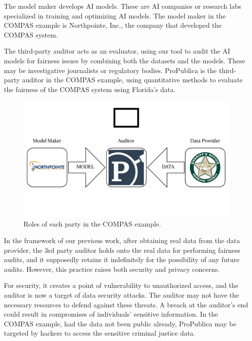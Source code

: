 \documentclass[manuscript,screen,review,anonymous]{acmart}
\begin{document}
The model maker develops AI models. These are AI companies or research labs specialized in training and optimizing AI models. The model maker in the COMPAS example is Northpointe, Inc., the company that developed the COMPAS system.

The third-party auditor acts as an evaluator, using our tool to audit the AI models for fairness issues by combining both the datasets and the models. These may be investigative journalists or regulatory bodies. ProPublica is the third-party auditor in the COMPAS example, using quantitative methods to evaluate the fairness of the COMPAS system using Florida's data.

\begin{figure}[h]
  \centering
  \includegraphics[width=\linewidth]{compas}
  \caption{Roles of each party in the COMPAS example.}
  \label{fig:compas}
\end{figure}

In the framework of our previous work\cite{yuan2024ensuring}, after obtaining real data from the data provider, the 3rd party auditor holds onto the real data for performing fairness audits, and it supposedly retains it indefinitely for the possibility of any future audits. However, this practice raises both security and privacy concerns.

For security, it creates a point of vulnerability to unauthorized access, and the auditor is now a target of data security attacks. The auditor may not have the necessary resources to defend against these threats. A breach at the auditor's end could result in compromises of individuals' sensitive information. In the COMPAS example, had the data not been public already, ProPublica may be targeted by hackers to access the sensitive criminal justice data.
\end{document}
